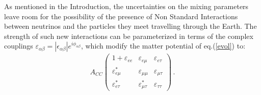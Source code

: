 \documentclass[12pt]{article}
\begin{document}
As mentioned in the Introduction, the uncertainties on the mixing parameters leave room for the possibility of the presence of Non Standard Interactions between neutrinos and the particles they meet travelling through the Earth. The strength of such new interactions can be parameterized in terms of the complex couplings 
$\varepsilon_{\alpha \beta}= |\epsilon_{\alpha\beta}| e^{i \phi_{\alpha\beta}}$, which modify the matter potential of eq.(\ref{evol}) to: 
% 
\begin{eqnarray} 
A_{CC} \left( \begin{array}{ccc}
            1 + \varepsilon_{ee}     & \varepsilon_{e\mu} & \varepsilon_{e\tau} \\
            \varepsilon_{e \mu }^*  & \varepsilon_{\mu\mu}  & \varepsilon_{\mu\tau} \\
            \varepsilon_{e \tau}^* & \varepsilon_{\mu \tau }^* & \varepsilon_{\tau\tau} 
                   \end{array} 
                   \right)\, .
\label{eq:matterNSI}\nonumber
\end{eqnarray}
\end{document}
